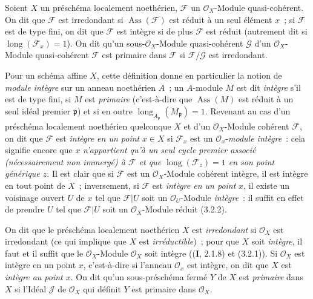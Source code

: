 \begin{definition}[3.2.4]
\label{IV.2.3.2.4-fr}
Soient $X$ un préschéma localement noethérien, $\mathcal F$ un
$\mathcal O_X$-Module quasi-cohérent. On dit que $\mathcal F$ est
irredondant si $\operatorname{Ass}(\mathcal F)$ est réduit à un seul
élément $x$~; si $\mathcal F$ est de type fini, on dit que $\mathcal F$ est
intègre si de plus $\mathcal F$ est réduit \textup{(autrement dit si
$\operatorname{long}(\mathcal F_x)=1$)}. On dit qu'un sous-$\mathcal O_X$-Module
quasi-cohérent $\mathcal G$ d'un $\mathcal O_X$-Module quasi-cohérent
$\mathcal F$ est primaire dans $\mathcal F$ si
$\mathcal F/\mathcal G$ est irredondant.
\end{definition}

Pour un schéma affine $X$, cette définition donne en particulier la notion de
\emph{module intègre} sur un anneau noethérien $A$~; un $A$-module $M$ est dit
\emph{intègre} s'il est de type fini, si $M$ est \emph{primaire} (c'est-à-dire
que $\operatorname{Ass}(M)$ est réduit à un seul idéal premier
$\mathfrak p$) et si en outre
$\operatorname{long}_{A_\mathfrak p}(M_\mathfrak p)=1$. Revenant au cas d'un
préschéma localement noethérien quelconque $X$ et d'un
$\mathcal O_X$-Module cohérent $\mathcal F$, on dit que $\mathcal F$ est
\emph{intègre en un point} $x\in X$ si $\mathcal F_x$ est un
$\mathcal O_x$-\emph{module intègre}~: cela signifie encore que $x$
\emph{n'appartient qu'à un seul cycle premier associé (nécessairement non
immergé) à $\mathcal F$ et que $\operatorname{long}(\mathcal F_z)=1$ en son
point générique $z$}. Il est clair que si $\mathcal F$ est un
$\mathcal O_X$-Module cohérent intègre, il est intègre en tout point de $X$~;
inversement, si $\mathcal F$ est \emph{intègre en un point} $x$, il existe un
voisinage ouvert $U$ de $x$ tel que $\mathcal F|U$
soit un $\mathcal O_U$-Module \emph{intègre}~: il suffit en effet de prendre
$U$ tel que $\mathcal F|U$ soit un $\mathcal O_X$-Module réduit (3.2.2).

On dit que le préschéma localement noethérien $X$ est \emph{irredondant} si
$\mathcal O_X$ est irredondant (ce qui implique que $X$ est
\emph{irréductible})~; pour que $X$ soit \emph{intègre}, il faut et il suffit
que le $\mathcal O_X$-Module $\mathcal O_X$ soit intègre ((\textbf{I}, 2.1.8) et
(3.2.1)). Si $\mathcal O_X$ est intègre en un point $x$, c'est-à-dire si
l'anneau $\mathcal O_x$ est intègre, on dit que $X$ est \emph{intègre au point
$x$}. On dit qu'un sous-préschéma fermé $Y$ de $X$ est \emph{primaire} dans
$X$ si l'Idéal $\mathcal J$ de $\mathcal O_X$ qui définit $Y$ est primaire
dans $\mathcal O_X$.

